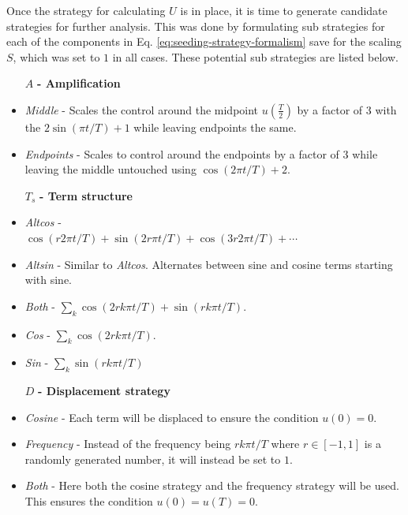 \documentclass[a4paper, twocolumn]{revtex4-1}
\begin{document}
Once the strategy for calculating $U$ is in place, it is time to generate candidate strategies for further analysis. This was done by formulating sub strategies for each of the components in Eq. \eqref{eq:seeding-strategy-formalism} save for the scaling $S$, which was set to $1$ in all cases. These potential sub strategies are listed below.

\begin{itemize}
	\item[$A$] \textbf{- Amplification}
	\item \textit{Middle} - Scales the control around the midpoint $u(\frac{T}{2})$ by a factor of 3 with the $2\sin(\pi t/T) + 1$ while leaving endpoints the same.
	\item \textit{Endpoints} - Scales to control around the endpoints by a factor of 3 while leaving the middle untouched using $\cos(2 \pi t/T) + 2$.
\end{itemize}

\begin{itemize}
	\item[$T_s$] \textbf{- Term structure}
	\item \textit{Altcos} - \\ $\cos(r 2\pi t/T) + \sin(2r \pi t/T) + \cos(3 r 2\pi t/T) + \cdots$
	\item \textit{Altsin} - Similar to \textit{Altcos}. Alternates between sine and cosine terms starting with sine.
	\item \textit{Both} - $\sum_k \cos(2rk\pi t/T) + \sin(rk\pi t/T)$.
	\item \textit{Cos} - $\sum_k \cos(2rk\pi t/T)$.
	\item \textit{Sin} - $\sum_k \sin(rk\pi t/T)$
\end{itemize}

\begin{itemize}
	\item[$D$] \textbf{- Displacement strategy}
	\item \textit{Cosine} - Each term will be displaced to ensure the condition $u(0) = 0$.
	\item \textit{Frequency} - Instead of the frequency being $rk\pi t/T$ where $r\in[-1,1]$ is a randomly generated number, it will instead be set to $1$.
	\item \textit{Both} - Here both the cosine strategy and the frequency strategy will be used. This ensures the condition $u(0) = u(T) = 0$. 
\end{itemize}
\end{document}
